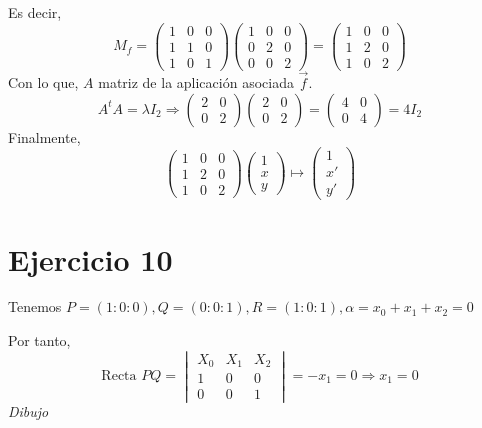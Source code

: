 \documentclass[10pt,a4paper,openright]{book}
\theoremstyle{break}
\begin{document}
Es decir,
\[
    M_f = \begin{pmatrix} 1 & 0 & 0\\ 1 & 1 & 0\\ 1 & 0 & 1 \end{pmatrix} \begin{pmatrix} 1 & 0 & 0\\ 0 & 2 & 0\\ 0 & 0 & 2 \end{pmatrix} = \begin{pmatrix} 1 & 0 & 0\\ 1 & 2 & 0\\ 1 & 0 & 2 \end{pmatrix}
\]
Con lo que, $A$ matriz de la aplicación asociada $\overrightarrow{f}$. 
\[
    A^tA = \lambda I_2 \Rightarrow \begin{pmatrix} 2 & 0\\ 0 & 2 \end{pmatrix} \begin{pmatrix} 2 & 0\\ 0 & 2 \end{pmatrix} = \begin{pmatrix} 4 & 0\\ 0 & 4 \end{pmatrix} = 4I_2
\]
Finalmente, 
\[
    \begin{pmatrix} 1 & 0 & 0\\ 1 & 2 & 0\\ 1 & 0 & 2 \end{pmatrix} \begin{pmatrix} 1\\ x\\ y \end{pmatrix} \mapsto \begin{pmatrix} 1\\ x'\\ y' \end{pmatrix} 
\]

\section{Ejercicio 10}%
\label{sec:ejercicio_10_2}
Tenemos $P = \left( 1 : 0 : 0 \right), Q = \left( 0 : 0 : 1 \right), R = \left( 1 : 0 : 1 \right), \alpha = x_0 + x_1 + x_2 = 0$

Por tanto,
\[
    \text{Recta } PQ = \begin{vmatrix} X_0 & X_1 & X_2\\ 1 & 0 & 0\\ 0 & 0 & 1 \end{vmatrix} = -x_1 = 0 \Rightarrow x_1 = 0
\]
\textit{Dibujo} 
\end{document}
